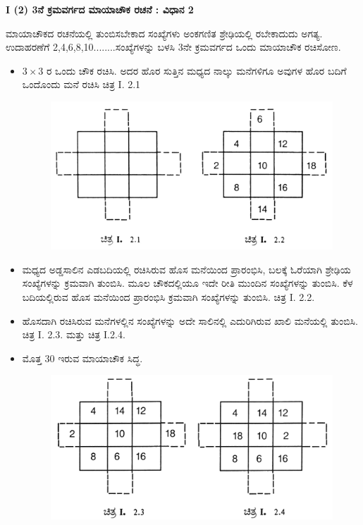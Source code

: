 \noindent \textbf{I (2) 3ನೆ ಕ್ರಮವರ್ಗದ ಮಾಯಾಚೌಕ ರಚನೆ : ವಿಧಾನ 2}

ಮಾಯಾಚೌಕದ ರಚನೆಯಲ್ಲಿ ತುಂಬಿಸಬೇಕಾದ ಸಂಖ್ಯೆಗಳು ಅಂಕಗಣಿತ ಶ್ರೇಢಿಯಲ್ಲಿ ರಬೇಕಾದುದು ಅಗತ್ಯ. ಉದಾಹರಣೆಗೆ 2,4,6,8,10........ಸಂಖ್ಯೆಗಳನ್ನು ಬಳಸಿ 3ನೇ ಕ್ರಮವರ್ಗದ ಒಂದು ಮಾಯಾಚೌಕ ರಚಿಸೋಣ.

\begin{itemize}
	\item $3 \times 3$ ರ ಒಂದು ಚೌಕ ರಚಿಸಿ. ಅದರ ಹೊರ ಸುತ್ತಿನ ಮಧ್ಯದ ನಾಲ್ಕು ಮನೆಗಳಿಗೂ ಅವುಗಳ ಹೊರ ಬದಿಗೆ ಒಂದೊಂದು ಮನೆ ರಚಿಸಿ ಚಿತ್ರ I. 2.1
	\begin{figure}[h]
	\includegraphics{src/figures/chap3/fig3.3.jpg}
	\end{figure}
	\item ಮಧ್ಯದ ಅಡ್ಡಸಾಲಿನ ಎಡಬದಿಯಲ್ಲಿ ರಚಿಸಿರುವ ಹೊಸ ಮನೆಯಿಂದ ಪ್ರಾರಂಭಿಸಿ, ಬಲಕ್ಕೆ ಓರೆಯಾಗಿ ಶ್ರೇಢಿಯ ಸಂಖ್ಯೆಗಳನ್ನು ಕ್ರಮವಾಗಿ ತುಂಬಿಸಿ. ಮೂಲ ಚೌಕದಲ್ಲಿಯೂ ಇದೇ ರೀತಿ ಮುಂದಿನ ಸಂಖ್ಯೆಗಳನ್ನು ತುಂಬಿಸಿ. ಕೆಳ ಬದಿಯಲ್ಲಿರುವ ಹೊಸ ಮನೆಯಿಂದ ಪ್ರಾರಂಭಿಸಿ ಕ್ರಮವಾಗಿ ಸಂಖ್ಯೆಗಳನ್ನು ತುಂಬಿಸಿ. ಚಿತ್ರ I. 2.2.
	\item ಹೊಸದಾಗಿ ರಚಿಸಿರುವ ಮನೆಗಳಲ್ಲಿನ ಸಂಖ್ಯೆಗಳನ್ನು ಅದೇ ಸಾಲಿನಲ್ಲಿ ಎದುರಿಗಿರುವ ಖಾಲಿ ಮನೆಯಲ್ಲಿ ತುಂಬಿಸಿ. ಚಿತ್ರ I. 2.3. ಮತ್ತು ಚಿತ್ರ I.2.4.
	\item ಮೊತ್ತ 30 ಇರುವ ಮಾಯಾಚೌಕ ಸಿದ್ಧ.
	\begin{figure}[h]
	\includegraphics{src/figures/chap3/fig3.4.jpg}
	\end{figure}
\end{itemize}

